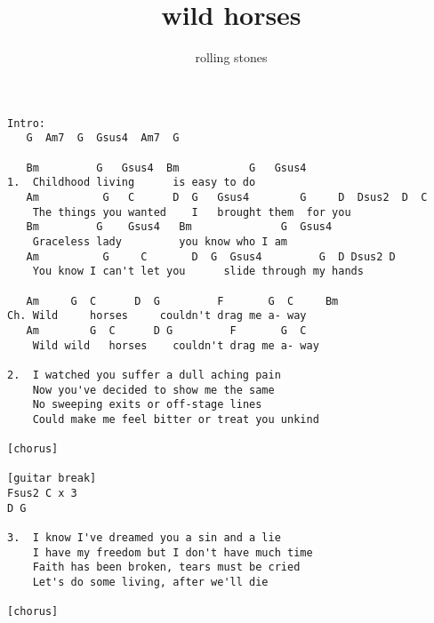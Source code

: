 \author{rolling stones}
\title{wild horses}
\maketitle
\begin{verbatim}
Intro:
   G  Am7  G  Gsus4  Am7  G

   Bm         G   Gsus4  Bm           G   Gsus4
1.  Childhood living      is easy to do
   Am          G   C      D  G   Gsus4        G     D  Dsus2  D  C
    The things you wanted    I   brought them  for you
   Bm         G    Gsus4   Bm              G  Gsus4
    Graceless lady         you know who I am
   Am          G     C       D  G  Gsus4         G  D Dsus2 D
    You know I can't let you      slide through my hands

   Am     G  C      D  G         F       G  C     Bm
Ch. Wild     horses     couldn't drag me a- way
   Am        G  C      D G         F       G  C
    Wild wild   horses    couldn't drag me a- way

2.  I watched you suffer a dull aching pain
    Now you've decided to show me the same
    No sweeping exits or off-stage lines
    Could make me feel bitter or treat you unkind

[chorus]

[guitar break]
Fsus2 C x 3
D G

3.  I know I've dreamed you a sin and a lie
    I have my freedom but I don't have much time
    Faith has been broken, tears must be cried
    Let's do some living, after we'll die

[chorus]
\end{verbatim}